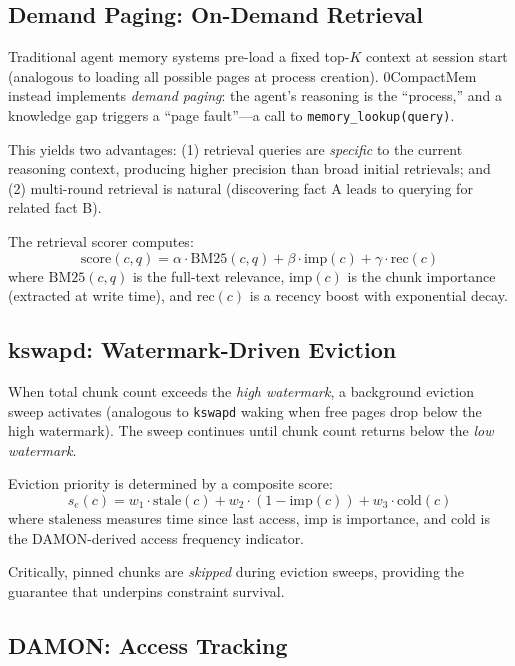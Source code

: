 \documentclass[10pt,twocolumn]{article}
\begin{document}
\subsection{Demand Paging: On-Demand Retrieval}

Traditional agent memory systems pre-load a fixed top-$K$ context at session start (analogous to loading all possible pages at process creation). 0CompactMem instead implements \emph{demand paging}: the agent's reasoning is the ``process,'' and a knowledge gap triggers a ``page fault''---a call to \texttt{memory\_lookup(query)}.

This yields two advantages: (1) retrieval queries are \emph{specific} to the current reasoning context, producing higher precision than broad initial retrievals; and (2) multi-round retrieval is natural (discovering fact A leads to querying for related fact B).

The retrieval scorer computes:
\begin{equation}
  \text{score}(c, q) = \alpha \cdot \text{BM25}(c, q) + \beta \cdot \text{imp}(c) + \gamma \cdot \text{rec}(c)
\end{equation}
where $\text{BM25}(c, q)$ is the full-text relevance, $\text{imp}(c)$ is the chunk importance (extracted at write time), and $\text{rec}(c)$ is a recency boost with exponential decay.

\subsection{kswapd: Watermark-Driven Eviction}

When total chunk count exceeds the \emph{high watermark}, a background eviction sweep activates (analogous to \texttt{kswapd} waking when free pages drop below the high watermark). The sweep continues until chunk count returns below the \emph{low watermark}.

Eviction priority is determined by a composite score:
\begin{equation}
  s_e(c) = w_1 \!\cdot\! \text{stale}(c) + w_2 \!\cdot\! (1{-}\text{imp}(c)) + w_3 \!\cdot\! \text{cold}(c)
\end{equation}
where $\text{staleness}$ measures time since last access, $\text{imp}$ is importance, and $\text{cold}$ is the DAMON-derived access frequency indicator.

Critically, pinned chunks are \emph{skipped} during eviction sweeps, providing the guarantee that underpins constraint survival.

\subsection{DAMON: Access Tracking}
\end{document}
